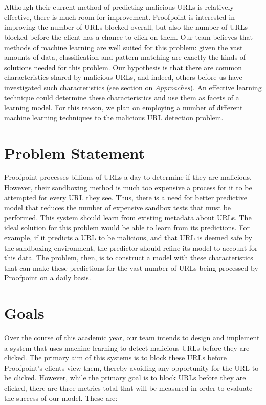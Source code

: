 \documentclass[cs,proposal]{hmcclinic}
\begin{document}
\\\\
Although their current method of predicting malicious URLs is relatively effective, there is much room for improvement. Proofpoint is interested in improving the number of URLs blocked overall, but also the number of URLs blocked before the client has a chance to click on them. Our team believes that methods of machine learning are well suited for this problem: given the vast amounts of data, classification and pattern matching are exactly the kinds of solutions needed for this problem. Our hypothesis is that there are common characteristics shared by malicious URLs, and indeed, others before us have investigated such characteristics (see section on \textit{Approaches}). An effective learning technique could determine these characteristics and use them as facets of a learning model. For this reason, we plan on employing a number of different machine learning techniques to the malicious URL detection problem.

\section{Problem Statement}

Proofpoint processes billions of URLs a day to determine if they are malicious. However, their sandboxing method is much too expensive a process for it to be attempted for every URL they see. Thus, there is a need for better predictive model that reduces the number of expensive sandbox tests that must be performed. This system should learn from existing metadata about URLs. The ideal solution for this problem would be able to learn from its predictions. For example, if it predicts a URL to be malicious, and that URL is deemed safe by the sandboxing environment, the predictor should refine its model to account for this data. The problem, then, is to construct a model with these characteristics that can make these predictions for the vast number of URLs being processed by Proofpoint on a daily basis.

\section{Goals}

Over the course of this academic year, our team intends to design and implement a system that uses machine learning to detect malicious URLs before they are clicked. The primary aim of this systems is to block these URLs before Proofpoint's clients view them, thereby avoiding any opportunity for the URL to be clicked. However, while the primary goal is to block URLs before they are clicked, there are three metrics total that will be measured in order to evaluate the success of our model. These are:
\end{document}
